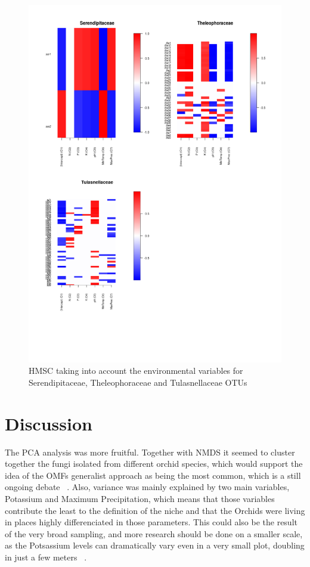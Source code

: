 \begin{figure}[htbp]
\centering
\includegraphics[keepaspectratio,width=\textwidth,height=0.75\textheight]{images/hmsc02.png}
\caption{HMSC taking into account the environmental variables for Serendipitaceae, Theleophoraceae and Tulasnellaceae OTUs}
\end{figure}

\part{Discussion}
\label{discussion}

The PCA analysis was more fruitful. Together with NMDS it seemed to cluster together the fungi isolated from different orchid species, which would support the idea of the OMFs generalist approach as being the most common, which is a still ongoing debate ~\citep{bailarote2012}. Also, variance was mainly explained by two main variables, Potassium and Maximum Precipitation, which means that those variables contribute the least to the definition of the niche and that the Orchids were living in places highly differenciated in those parameters. This could also be the result of the very broad sampling, and more research should be done on a smaller scale, as the Potsassium levels can dramatically vary even in a very small plot, doubling in just a few meters ~\citep{bogunovic2014}.

